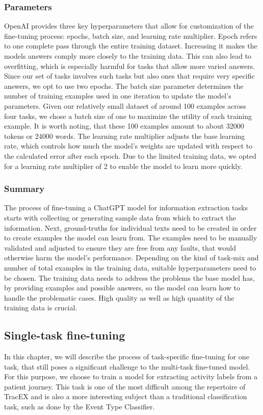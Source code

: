 \subsubsection{Parameters}
OpenAI provides three key hyperparameters that allow for customization of the fine-tuning process: epochs, batch size, and learning rate multiplier. Epoch refers to one complete pass through the entire training dataset. Increasing it makes the models answers comply more closely to the training data. This can also lead to overfitting, which is especially harmful for tasks that allow more varied answers. Since our set of tasks involves such tasks but also ones that require very specific answers, we opt to use two epochs. The batch size parameter determines the number of training examples used in one iteration to update the model’s parameters. Given our relatively small dataset of around 100 examples across four tasks, we chose a batch size of one to maximize the utility of each training example. It is worth noting, that these 100 examples amount to about 32000 tokens or 24000 words. The learning rate multiplier adjusts the base learning rate, which controls how much the model’s weights are updated with respect to the calculated error after each epoch. Due to the limited training data, we opted for a learning rate multiplier of 2 to enable the model to learn more quickly. 

\subsubsection{Summary}
The process of fine-tuning a ChatGPT model for information extraction tasks starts with collecting or generating sample data from which to extract the information. Next, ground-truths for individual texts need to be created in order to create examples the model can learn from. The examples need to be manually validated and adjusted to ensure they are free from any faults, that would otherwise harm the model's performance. Depending on the kind of task-mix and number of total examples in the training data, suitable hyperparameters need to be chosen. The training data needs to address the problems the base model has, by providing examples and possible answers, so the model can learn how to handle the problematic cases. High quality as well as high quantity of the training data is crucial.

\subsection{Single-task fine-tuning}\label{sec:single-task-ft}
In this chapter, we will describe the process of task-specific fine-tuning for one task, that still poses a significant challenge to the multi-task fine-tuned model. For this purpose, we choose to train a model for extracting activity labels from a patient journey. This task is one of the most difficult among the repertoire of TracEX and is also a more interesting subject than a traditional classification task, such as done by the Event Type Classifier.
